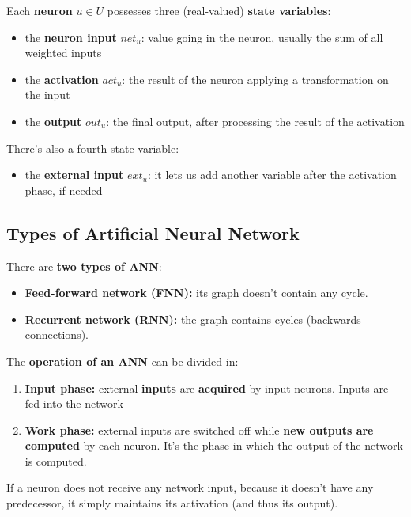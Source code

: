Each \textbf{neuron} $u \in U$ possesses three (real-valued) \textbf{state variables}:
\begin{itemize}
	\item the \textbf{neuron input} $net_u$: value going in the neuron, usually the sum of all weighted inputs 
	\item the \textbf{activation} $act_u$: the result of the neuron applying a transformation on the input
	\item the \textbf{output} $out_u$: the final output, after processing the result of the activation
\end{itemize}
There's also a fourth state variable: 
\begin{itemize}
	\item the \textbf{external input} $ext_u$: it lets us add another variable after the activation phase, if needed
\end{itemize}

\newpage

\subsection{Types of Artificial Neural Network}
There are \textbf{two types of ANN}: 
\begin{itemize}
	\item \textbf{Feed-forward network (FNN):} its graph doesn't contain any cycle.\\
	
	\item \textbf{Recurrent network (RNN):} the graph contains cycles (backwards connections).\\
\end{itemize}

The \textbf{operation of an ANN} can be divided in: 
\begin{enumerate}
	\item \textbf{Input phase:} external \textbf{inputs} are \textbf{acquired} by input neurons. Inputs are fed into the network\\
	
	\item \textbf{Work phase:} external inputs are switched off while \textbf{new outputs are computed} by each neuron. It's the phase in which the output of the network is computed.\\
\end{enumerate}

If a neuron does not receive any network input, because it doesn't have any predecessor, it simply maintains its activation (and thus its output).\\

